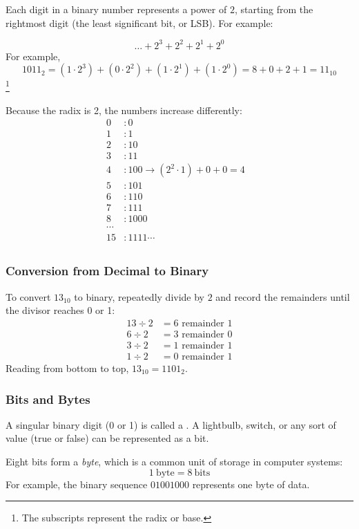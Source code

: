 Each digit in a binary number represents a power of $2$, starting from the rightmost digit (the least significant bit, or LSB). For example:

\[
  \dots + 2^3 + 2^2 + 2^1 + 2^0
\]
For example,
\[
1011_2 = (1 \cdot 2^3) + (0 \cdot 2^2) + (1 \cdot 2^1) + (1 \cdot 2^0) = 8 + 0 + 2 + 1 = 11_{10}
\]\footnote{The subscripts represent the radix or base.}

Because the radix is 2, the numbers increase differently:
\begin{align*}
  0&: 0 \\
  1&: 1 \\
  2&: 10 \\
  3&: 11 \\
  4&: 100 \rightarrow (2^{2}\cdot 1) + 0 + 0 = 4 \\
  5&: 101 \\
  6&: 110 \\
  7&: 111 \\
  8&: 1000 \\
  \cdots& \\
  15&: 1111
  \cdots& \\
\end{align*}

\subsubsection*{Conversion from Decimal to Binary}
To convert $13_{10}$ to binary, repeatedly divide by $2$ and record the remainders until the divisor reaches 0 or 1:
\begin{align*}
13 \div 2 &= 6 \text{ remainder } 1 \\
6 \div 2 &= 3 \text{ remainder } 0 \\
3 \div 2 &= 1 \text{ remainder } 1 \\
1 \div 2 &= 0 \text{ remainder } 1
\end{align*}
Reading from bottom to top, $13_{10} = 1101_2$.

\subsubsection{Bits and Bytes}
A singular binary digit (0 or 1) is called a . 
A lightbulb, switch, or any sort of  value (true or false) can be represented as a bit.
 
Eight bits form a \emph{byte}, which is a common unit of storage in computer systems:
\[
1\ \text{byte} = 8\ \text{bits}
\]
For example, the binary sequence $01001000$ represents one byte of data.

